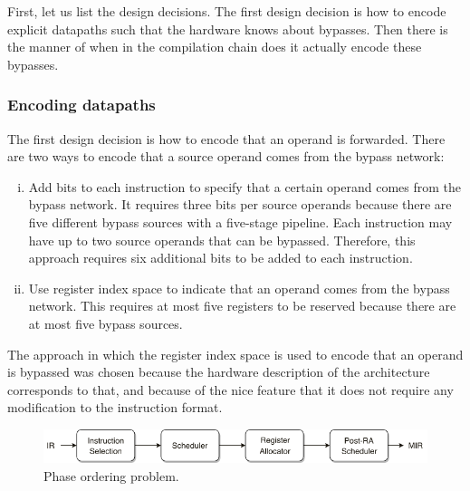 
First, let us list the design decisions. The first design decision is how to encode explicit datapaths such that the hardware knows about bypasses. Then there is the manner of when in the compilation chain does it actually encode these bypasses.


\subsubsection{Encoding datapaths}
The first design decision is how to encode that an operand is forwarded. There are two ways to encode that a source operand comes from the bypass network:
\begin{enumerate}[i.]
  \item Add bits to each instruction to specify that a certain operand comes from the bypass network. It requires three bits per source operands because there are five different bypass sources with a five-stage pipeline. Each instruction may have up to two source operands that can be bypassed. Therefore, this approach requires six additional bits to be added to each instruction.
  \item Use register index space to indicate that an operand comes from the bypass network. This requires at most five registers to be reserved because there are at most five bypass sources.
\end{enumerate} 

The approach in which the register index space is used to encode that an operand is bypassed was chosen because the hardware description of the architecture corresponds to that, and because of the nice feature that it does not require any modification to the instruction format.

\begin{figure}[b]
\centering
\includegraphics[width=.9\textwidth]{figures/phase_ordering}
\caption{Phase ordering problem.}
\label{fig:phase_ordering}
\end{figure}

